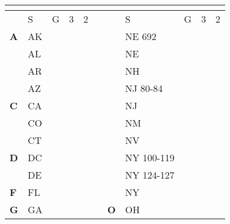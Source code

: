\documentclass[twocolumn]{article}
\newenvironment{tttabular}[1]%
{\ttfamily \begin{tabular}{#1}}%
{\end{tabular}}
\begin{document}
\begin{adjustbox}{valign=t, max totalheight=\textheight}
\Large{}
\centering
\begin{tttabular}{@{}>{\bfseries}lll|l|ll >{\bfseries}lll|l|l@{}}
\multicolumn{10}{c}{\textbf{US States}} \\
\toprule
  & S          & G                  & 3                  & 2                  &  &   & S           & G                  & 3                  & 2                  \\ \midrule
A & AK         & \cellcolor{orange} & \cellcolor{blue}   & \cellcolor{blue}   &  &   & NE 692      & \cellcolor{purple} & \cellcolor{purple} & \cellcolor{purple} \\
  & AL         & \cellcolor{grey}   & \cellcolor{grey}   & \cellcolor{blue}   &  &   & NE          & \cellcolor{yellow} & \cellcolor{yellow} & \cellcolor{yellow} \\
  & AR         & \cellcolor{orange} & \cellcolor{orange} & \cellcolor{blue}   &  &   & NH          & \cellcolor{blue}   & \cellcolor{blue}   & \cellcolor{blue}   \\
  & AZ         & \cellcolor{orange} & \cellcolor{blue}   & \cellcolor{blue}   &  &   & NJ 80-84    & \cellcolor{yellow} & \cellcolor{yellow} & \cellcolor{blue}   \\
C & CA         & \cellcolor{blue}   & \cellcolor{blue}   & \cellcolor{blue}   &  &   & NJ          & \cellcolor{red}    & \cellcolor{blue}   & \cellcolor{blue}   \\
  & CO         & \cellcolor{yellow} & \cellcolor{yellow} & \cellcolor{blue}   &  &   & NM          & \cellcolor{yellow} & \cellcolor{yellow} & \cellcolor{blue}   \\
  & CT         & \cellcolor{blue}   & \cellcolor{blue}   & \cellcolor{blue}   &  &   & NV          & \cellcolor{orange} & \cellcolor{blue}   & \cellcolor{blue}   \\
D & DC         & \cellcolor{orange} & \cellcolor{orange} & \cellcolor{blue}   &  &   & NY 100-119  & \cellcolor{red}    & \cellcolor{blue}   & \cellcolor{blue}   \\
  & DE         & \cellcolor{orange} & \cellcolor{orange} & \cellcolor{blue}   &  &   & NY 124-127  & \cellcolor{red}    & \cellcolor{blue}   & \cellcolor{blue}   \\
F & FL         & \cellcolor{green}  & \cellcolor{green}  & \cellcolor{blue}   &  &   & NY          & \cellcolor{red}    & \cellcolor{red}    & \cellcolor{blue}   \\
G & GA         & \cellcolor{yellow} & \cellcolor{yellow} & \cellcolor{blue}   &  & O & OH          & \cellcolor{purple} & \cellcolor{purple} & \cellcolor{purple} \\

\end{tttabular}
\end{adjustbox}
\end{document}
